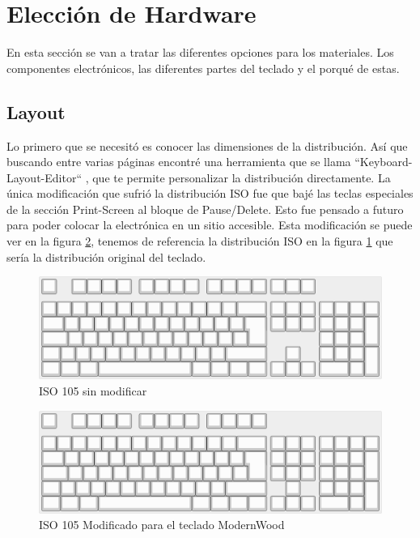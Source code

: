 \section{Elección de Hardware} \label{DiseñoHardware}
En esta sección se van a tratar las diferentes opciones para los materiales. Los componentes electrónicos, las diferentes partes del teclado y el porqué de estas.

\subsection{Layout} \label{DiseñoLayaout}
Lo primero que se necesitó es conocer las dimensiones de la distribución. Así que buscando entre varias páginas encontré una herramienta que se llama ``Keyboard-Layout-Editor`` \cite{Layout-Editor}, que te permite personalizar la distribución directamente. La única modificación que sufrió la distribución \gls{ISO} fue que bajé las teclas especiales de la sección Print-Screen al bloque de Pause/Delete. Esto fue pensado a futuro para poder colocar la electrónica en un sitio accesible. Esta modificación se puede ver en la figura \ref{fig:eISo_layout_modificado}, tenemos de referencia la distribución \gls{ISO} en la figura \ref{fig:ISO_layout} que sería la distribución original del teclado.

\begin{figure}[H] %
    \centering
    \includegraphics[width=1\textwidth]{imagenes/Capitulos/Cap03/ISO105Layout.png}
    \caption{\gls{ISO} 105 sin modificar}
    \label{fig:ISO_layout}
\end{figure}

\begin{figure}[H] %
    \centering
    \includegraphics[width=1\textwidth]{imagenes/Capitulos/Cap03/ModernWoodLayout.png}
    \caption{\gls{ISO} 105 Modificado para el teclado ModernWood}
    \label{fig:eISo_layout_modificado}
\end{figure}


